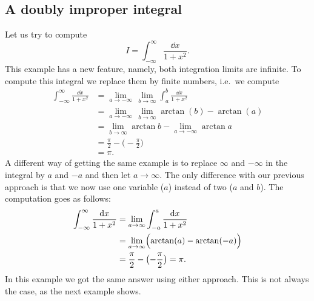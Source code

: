 


\subsection{A doubly improper integral}  Let us try to compute %
\[
I = \int_{-\infty}^\infty \frac{\dd x} {1+x^2}.
\]
This example has a new feature, namely, both integration limits are infinite.
To compute this integral we replace them by finite numbers, i.e.~we compute
\begin{align*}
  \int_{-\infty}^\infty \frac{\dd x} {1+x^2}
  & = \lim_{a\to-\infty} \,\lim_{b\to\infty}
  \int_a^b \frac{\dd x} {1+x^2}\\
  & =  \lim_{a\to-\infty} \,\lim_{b\to\infty} \arctan(b) - \arctan(a) \\
  & = \lim_{b\to\infty} \arctan b  - \lim_{a\to-\infty} \arctan a \\
  & = \frac{\pi} {2} - \bigl(-\frac{\pi} {2}\bigr) \\
  & = \pi.
\end{align*}
{\color{badgerred}\bfseries\textdbend}
A different way of getting the same example is to replace $\infty$ and $-\infty$
in the integral by $a$ and $-a$ and then let $a\to\infty$.  The only difference
with our previous approach is that we now use one variable ($a$) instead of two
($a$ and $b$).  The computation goes as follows:
\begin{align*}
  \int_{-\infty}^\infty \frac{\mathrm{d} x} {1+x^2}
  &= \lim_{a\to\infty} \int_{-a}^a  \frac{\mathrm{d} x} {1+x^2} \\
  &= \lim_{a\to\infty} \Bigl(\arctan(a) - \arctan(-a)\Bigr)\\
  &= \frac\pi2 - \bigl(-\frac\pi2\bigr) = \pi.
\end{align*}
In this example we got the same answer using either approach.  This is not
always the case, as the next example shows.
